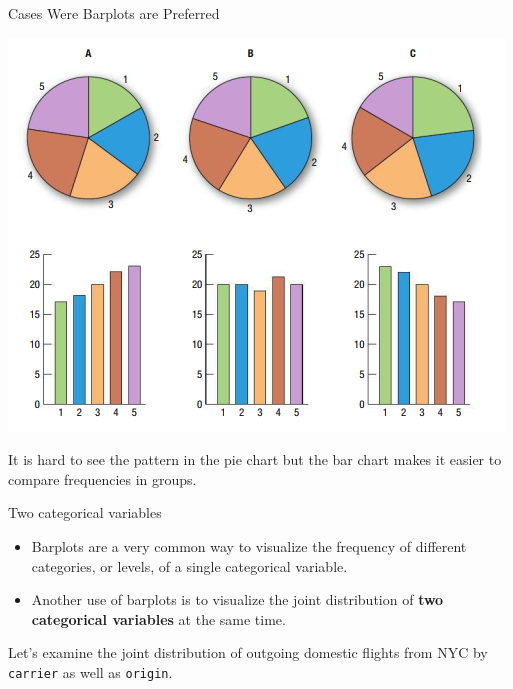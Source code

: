 \documentclass[
  ignorenonframetext,
]{beamer}
\begin{document}
\begin{frame}{Cases Were Barplots are Preferred}
\protect\hypertarget{cases-were-barplots-are-preferred}{}
\begin{center}\includegraphics[width=0.8\linewidth,height=0.7\textheight]{week2_4} \end{center}

It is hard to see the pattern in the pie chart but the bar chart makes
it easier to compare frequencies in groups.
\end{frame}

\begin{frame}[fragile]{Two categorical variables}
\protect\hypertarget{two-categorical-variables}{}
\begin{itemize}
\item
  Barplots are a very common way to visualize the frequency of different
  categories, or levels, of a single categorical variable.
\item
  Another use of barplots is to visualize the joint distribution of
  \textbf{two categorical variables} at the same time.
\end{itemize}

Let's examine the joint distribution of outgoing domestic flights from
NYC by \texttt{carrier} as well as \texttt{origin}.
\end{frame}
\end{document}
